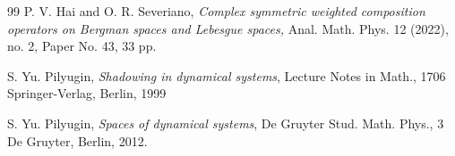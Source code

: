 \documentclass[11pt]{amsart}%
\numberwithin{equation}{section}
\theoremstyle{plain}
\theoremstyle{definition}
\theoremstyle{definition}
\begin{document}
\begin{thebibliography}{99}
 P. V. Hai and O. R. Severiano, \emph{
Complex symmetric weighted composition operators on Bergman spaces and Lebesgue spaces,}
Anal. Math. Phys.   12 (2022), no. 2, Paper No. 43, 33 pp.


    
		
		
		
		
		
		


        

 S. Yu. Pilyugin, \emph{
Shadowing in dynamical systems},
Lecture Notes in Math., 1706
Springer-Verlag, Berlin, 1999

  S. Yu. Pilyugin, \emph{
Spaces of dynamical systems},
De Gruyter Stud. Math. Phys., 3
De Gruyter, Berlin, 2012. 
        


\end{thebibliography}
\end{document}
